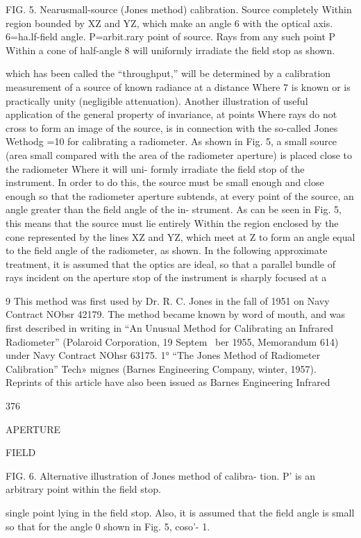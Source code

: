 FIG. 5. Nearusmall-source (Jones method) calibration.
Source completely Within region bounded by XZ and YZ,
which make an angle 6 with the optical axis. 6=ha.lf-field
angle. P=arbit.rary point of source. Rays from any such
point P Within a cone of half-angle 8 will uniformly irradiate
the field stop as shown.

which has been called the “throughput,” will be
determined by a calibration measurement of a
source of known radiance at a distance Where 7
is known or is practically unity (negligible
attenuation).
Another illustration of useful application of
the general property of invariance, at points
Where rays do not cross to form an image of the
source, is in connection with the so-called Jones
Wethodg =10 for calibrating a radiometer. As shown
in Fig. 5, a small source (area small compared
with the area of the radiometer aperture) is
placed close to the radiometer Where it will uni-
formly irradiate the field stop of the instrument.
In order to do this, the source must be small
enough and close enough so that the radiometer
aperture subtends, at every point of the source,
an angle greater than the field angle of the in-
strument. As can be seen in Fig. 5, this means
that the source must lie entirely Within the region
enclosed by the cone represented by the lines
XZ and YZ, which meet at Z to form an angle
equal to the field angle of the radiometer, as
shown.
In the following approximate treatment, it is
assumed that the optics are ideal, so that a
parallel bundle of rays incident on the aperture
stop of the instrument is sharply focused at a

9 This method was first used by Dr. R. C. Jones in the
fall of 1951 on Navy Contract NObsr 42179. The method
became known by word of mouth, and was first described
in writing in “An Unusual Method for Calibrating an
Infrared Radiometer” (Polaroid Corporation, 19 Septem~
ber 1955, Memorandum 614) under Navy Contract
NOhsr 63175.
1° “The Jones Method of Radiometer Calibration” Tech»
mignes (Barnes Engineering Company, winter, 1957).
Reprints of this article have also been issued as Barnes
Engineering Infrared


376

APERTURE

FIELD

FIG. 6. Alternative illustration of Jones method of calibra-
tion. P’ is an arbitrary point within the field stop.

single point lying in the field stop. Also, it is
assumed that the field angle is small so that for
the angle 0 shown in Fig. 5, coso'- 1.

